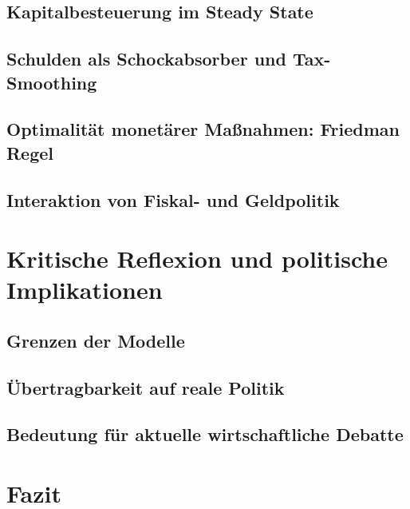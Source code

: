 \subsection{Kapitalbesteuerung im Steady State}

\subsection{Schulden als Schockabsorber und Tax-Smoothing} %


\subsection{Optimalität monetärer Ma{\ss}nahmen: Friedman Regel}

\subsection{Interaktion von Fiskal- und Geldpolitik} 


\newpage

\section{Kritische Reflexion und politische Implikationen}

\subsection{Grenzen der Modelle}

\subsection{Übertragbarkeit auf reale Politik}

\subsection{Bedeutung für aktuelle wirtschaftliche Debatte}

\newpage

\section{Fazit}
